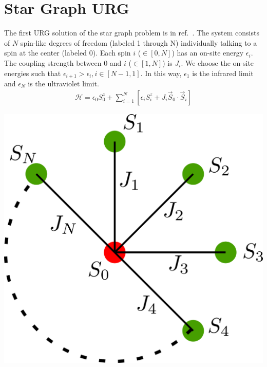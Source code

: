 \documentclass[twoside,11pt]{report}
\numberwithin{equation}{section}
\begin{document}
\section{Star Graph URG}
\begin{minipage}{260pt}
	The first URG solution of the star graph problem is in ref.~\cite{spa_star}. The system consists of \(N\) spin-like degrees of freedom (labeled 1 through N) individually talking to a spin at the center (labeled 0). Each spin \(i\) (\(\in \left[0,N\right]\)) has an on-site energy \(\epsilon_i\). The coupling strength between 0 and \(i\) (\(\in \left[1,N\right]\)) is \(J_i\). We choose the on-site energies such that \(\epsilon_{i+1} > \epsilon_i, i\in\left[N-1,1\right]\). In this way, \(\epsilon_1\) is the infrared limit and \(\epsilon_N\) is the ultraviolet limit.
\begin{equation}\begin{aligned}
	\mathcal{H} = \epsilon_0 S^z_0 + \sum_{i=1}^N\left[\epsilon_i S^z_i + J_i \vec{S}_0 \cdot \vec{S}_i\right]
\end{aligned}\end{equation}
\end{minipage}
\hspace*{20pt}
\begin{minipage}{200pt}
\begin{center}
\includegraphics[scale=0.2]{../figures/stargraph_.png}
\end{center}
\end{minipage}
\end{document}
